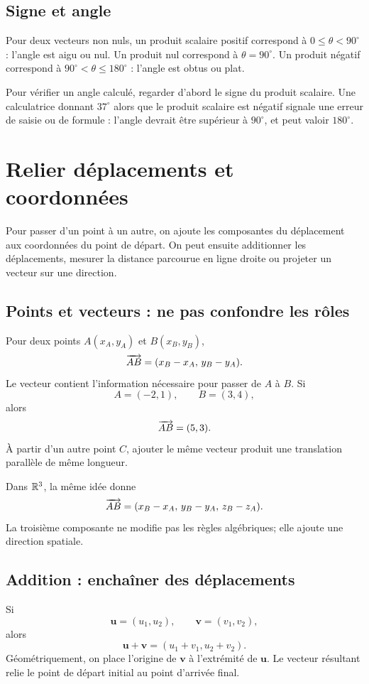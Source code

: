\subsection{Signe et angle}
Pour deux vecteurs non nuls, un produit scalaire positif correspond à \(0\leq\theta<90^\circ\) : l'angle est aigu ou nul. Un produit nul correspond à \(\theta=90^\circ\). Un produit négatif correspond à \(90^\circ<\theta\leq180^\circ\) : l'angle est obtus ou plat.

\begin{visualbox}
Pour vérifier un angle calculé, regarder d'abord le signe du produit scalaire. Une calculatrice donnant $37^\circ$ alors que le produit scalaire est négatif signale une erreur de saisie ou de formule : l'angle devrait être supérieur à $90^\circ$, et peut valoir $180^\circ$.
\end{visualbox}


\section{Relier déplacements et coordonnées}
\label{manual:section:09.08}

Pour passer d'un point à un autre, on ajoute les composantes du déplacement aux coordonnées du point de départ. On peut ensuite additionner les déplacements, mesurer la distance parcourue en ligne droite ou projeter un vecteur sur une direction.

\subsection{Points et vecteurs : ne pas confondre les rôles}

Pour deux points $A(x_A,y_A)$ et $B(x_B,y_B)$,
\[
\overrightarrow{AB}=(x_B-x_A,\,y_B-y_A).
\]
Le vecteur contient l'information nécessaire pour passer de $A$ à $B$. Si
\[
A=(-2,1),\qquad B=(3,4),
\]
alors
\[
\overrightarrow{AB}=(5,3).
\]
À partir d'un autre point $C$, ajouter le même vecteur produit une translation parallèle de même longueur.

Dans $\mathbb{R}^3$, la même idée donne
\[
\overrightarrow{AB}=(x_B-x_A,\,y_B-y_A,\,z_B-z_A).
\]
La troisième composante ne modifie pas les règles algébriques; elle ajoute une direction spatiale.

\subsection{Addition : enchaîner des déplacements}

Si
\[
\mathbf u=(u_1,u_2),
\qquad
\mathbf v=(v_1,v_2),
\]
alors
\[
\mathbf u+\mathbf v=(u_1+v_1,u_2+v_2).
\]
Géométriquement, on place l'origine de $\mathbf v$ à l'extrémité de $\mathbf u$. Le vecteur résultant relie le point de départ initial au point d'arrivée final.

